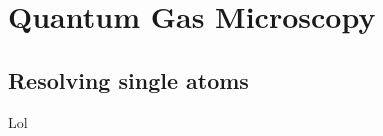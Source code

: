 \chapter{Quantum Gas Microscopy}

\section{Resolving single atoms}



Lol \cite{bakr_quantum_2009}

\printbibliography
